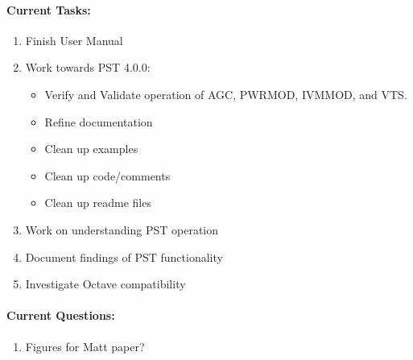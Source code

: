 \documentclass[12pt]{article}
\begin{document}
\begin{multicols}{2}
\paragraph{Current Tasks:}
\begin{enumerate}
	\itemsep 0em 

	\item Finish User Manual

	\item Work towards PST 4.0.0:
		\begin{itemize}
			\footnotesize
			\itemsep0em
			\item Verify and Validate operation of AGC, PWRMOD, IVMMOD, and VTS.
			\item Refine documentation	
			\item Clean up examples
			\item Clean up code/comments
			\item Clean up readme files
		\end{itemize}

	\item Work on understanding PST operation
	\item Document findings of PST functionality
	\item Investigate Octave compatibility
\end{enumerate}

\vfill\null
\columnbreak

\paragraph{Current Questions:}
	\begin{enumerate}
	\itemsep0em 
	\item Figures for Matt paper?
	
	\end{enumerate}	


\end{multicols}
\end{document}
